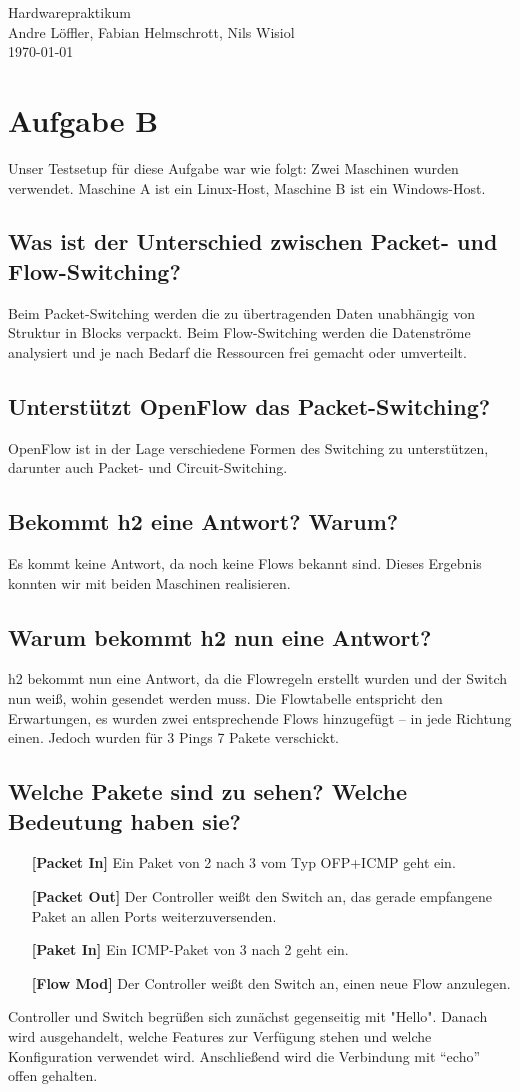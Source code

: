 \documentclass[a4paper,10pt]{scrartcl}
\begin{document}
\begin{center}
  \Huge Hardwarepraktikum \\
  \large Andre Löffler, Fabian Helmschrott, Nils Wisiol \\
  \today
\end{center}


\section*{Aufgabe B}
  Unser Testsetup für diese Aufgabe war wie folgt: Zwei Maschinen wurden verwendet. Maschine A ist ein Linux-Host, Maschine B ist ein Windows-Host.
\subsection*{Was ist der Unterschied zwischen Packet- und Flow-Switching?}
  Beim Packet-Switching werden die zu \"ubertragenden Daten unabh\"angig von Struktur in Blocks verpackt. Beim Flow-Switching werden die Datenstr\"ome analysiert und je nach Bedarf die Ressourcen frei gemacht oder umverteilt.
\subsection*{Unterstützt OpenFlow das Packet-Switching?}
  OpenFlow ist in der Lage verschiedene Formen des Switching zu unterst\"utzen, darunter auch Packet- und Circuit-Switching. 
\subsection*{Bekommt h2 eine Antwort? Warum?}
  Es kommt keine Antwort, da noch keine Flows bekannt sind. Dieses Ergebnis konnten wir mit beiden Maschinen realisieren.
\subsection*{Warum bekommt h2 nun eine Antwort?}
  h2 bekommt nun eine Antwort, da die Flowregeln erstellt wurden und der Switch nun weiß, wohin gesendet werden muss. Die Flowtabelle entspricht den Erwartungen, es wurden zwei entsprechende Flows hinzugefügt -- in jede Richtung einen. Jedoch wurden für 3 Pings 7 Pakete verschickt.
\subsection*{Welche Pakete sind zu sehen? Welche Bedeutung haben sie?}
  \begin{itemize}
    \item[\textbf{[Packet In]}] Ein Paket von 2 nach 3 vom Typ OFP+ICMP geht ein.
    \item[\textbf{[Packet Out]}] Der Controller weißt den Switch an, das gerade empfangene Paket an allen Ports weiterzuversenden.
    \item[\textbf{[Paket In]}] Ein ICMP-Paket von 3 nach 2 geht ein.
    \item[\textbf{[Flow Mod]}] Der Controller weißt den Switch an, einen neue Flow anzulegen.
  \end{itemize}
  Controller und Switch begrüßen sich zunächst gegenseitig mit "Hello". Danach wird ausgehandelt, welche Features zur Verfügung stehen und welche Konfiguration verwendet wird. Anschließend wird die Verbindung mit  ``echo'' offen gehalten.
\end{document}
